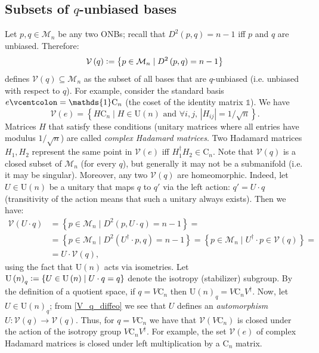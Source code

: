 \documentclass[referee,sn-mathphys-num]{sn-jnl}%
\theoremstyle{thmstyleone}%
\theoremstyle{thmstyletwo}%
\theoremstyle{remark}
\theoremstyle{thmstylethree}%
\newcommand{\abs}[1]{\left\vert#1\right\vert}
\newcommand{\defeq}{\vcentcolon=}
\begin{document}
\subsection{Subsets of $q$-unbiased bases}\label{sec:Vq}
Let $ p, q \in \mathcal{M}_n $ be any two ONBs; recall that $ D^2 \left( p, q \right) = n-1$ iff $p$ and $q$ are unbiased. Therefore:
\begin{equation}
	\mathcal{V} \left( q \right) \defeq \left\{ p \in \mathcal{M}_n \mid D^2 \left( p, q \right) = n-1 \right\} 
\end{equation}
defines $ \mathcal{V}\left( q \right) \subseteq \mathcal{M}_n $ as the subset of all bases that are $ q $-unbiased (i.e. unbiased with respect to $q$).
For example, consider the standard basis $e \defeq \mathds{1} \mathrm{C}_n $ (the coset of the identity matrix $ \mathds{1} $). We have 
\begin{equation}
	\mathcal{V} \left( e \right) = \left\{ H \mathrm{C}_n \mid H \in \mathrm{U} \left( n \right) \text{ and } \forall i,j, \, \abs{H_{ij}}=1/\sqrt{n} \right\} .
\end{equation}
Matrices $H$ that satisfy these conditions (unitary matrices where all entries have modulus $ 1 / \sqrt{n} $) are called \textit{complex Hadamard matrices}.
Two Hadamard matrices $ H_1, H_2 $ represent the same point in $ \mathcal{V} \left( e \right) $ iff $ H_1^\dagger H_2 \in \mathrm{C}_n $. Note that $ \mathcal{V} \left( q \right) $ is a closed subset of $ \mathcal{M}_n $ (for every $q$), but generally it may not be a submanifold (i.e. it may be singular). Moreover, any two $ \mathcal{V} \left( q \right) $ are homeomorphic. Indeed, let $ U \in \mathrm{U} \left( n \right) $ be a unitary that maps $ q $ to $ q' $ via the left action: $ q' = U \cdot q $ (transitivity of the action means that such a unitary always exists). Then we have:
\begin{align}\label{V_q_diffeo}
	\mathcal{V} \left( U \cdot q \right) & = \left\{ p \in \mathcal{M}_n \mid D^2 \left( p, U \cdot q \right) = n-1 \right\} = \nonumber\\
	& = \left\{ p \in \mathcal{M}_n \mid D^2 \left( U^\dagger \cdot p, q \right) = n-1 \right\} = \left\{ p \in \mathcal{M}_n \mid U^\dagger \cdot p \in \mathcal{V} \left( q \right) \right\} = \nonumber\\
	& = U \cdot \mathcal{V} \left( q \right) ,
\end{align}
using the fact that $ \mathrm{U} \left( n \right) $ acts via isometries. 
Let $ \mathrm{U} \left( n \right)_q \defeq \left\{ U \in \mathrm{U} \left( n \right) \mid U \cdot q = q \right\} $ denote the isotropy (stabilizer) subgroup. By the definition of a quotient space, if $q = V \mathrm{C}_n$ then $ \mathrm{U} \left( n \right)_q = V \mathrm{C}_n V^\dagger $.
Now, let $ U \in \mathrm{U} \left( n \right)_q $; from \eqref{V_q_diffeo} we see that $ U $ defines an \textit{automorphism} $ U : \mathcal{V} \left( q \right) \rightarrow \mathcal{V} \left( q \right) $. Thus, for $ q = V \mathrm{C}_n $ we have that $ \mathcal{V} \left( V \mathrm{C}_n \right) $ is closed under the action of the isotropy group $ V \mathrm{C}_n V^\dagger $. For example, the set $ \mathcal{V} \left( e \right) $ of complex Hadamard matrices is closed under left multiplication by a $ \mathrm{C}_n $ matrix.
\end{document}
